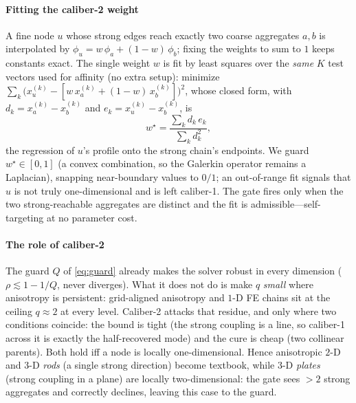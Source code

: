 \documentclass[review]{siamart220329}
\begin{document}
\paragraph{Fitting the caliber-2 weight} A fine node $u$ whose strong edges reach exactly two
coarse aggregates $a,b$ is interpolated by $\phi_u=w\,\phi_a+(1-w)\,\phi_b$; fixing the weights
to sum to $1$ keeps constants exact. The single weight $w$ is fit by least squares over the
\emph{same} $K$ test vectors used for affinity (no extra setup): minimize
$\sum_k \big(x^{(k)}_u-[w\,x^{(k)}_a+(1-w)\,x^{(k)}_b]\big)^2$, whose closed form, with
$d_k=x^{(k)}_a-x^{(k)}_b$ and $e_k=x^{(k)}_u-x^{(k)}_b$, is
\begin{equation}\label{eq:wfit}
w^\star=\frac{\sum_k d_k\,e_k}{\sum_k d_k^2},
\end{equation}
the regression of $u$'s profile onto the strong chain's endpoints. We guard $w^\star\in[0,1]$
(a convex combination, so the Galerkin operator remains a Laplacian), snapping
near-boundary values to $0/1$; an out-of-range fit signals that $u$ is not truly one-dimensional
and is left caliber-1. The gate fires only when the two strong-reachable aggregates are distinct
and the fit is admissible---self-targeting at no parameter cost.

\paragraph{The role of caliber-2} The guard $Q$ of \eqref{eq:guard} already makes the solver robust in every
dimension ($\rho\lesssim1-1/Q$, never diverges). What it does not do is make $q$ \emph{small}
where anisotropy is persistent: grid-aligned anisotropy and $1$-D FE chains sit at the ceiling
$q\approx2$ at every level. Caliber-2 attacks that residue, and only where two conditions
coincide: the bound is tight (the strong coupling is a line, so caliber-1 across it is exactly
the half-recovered mode) and the cure is cheap (two collinear parents). Both hold iff a node is
locally one-dimensional. Hence anisotropic $2$-D and $3$-D \emph{rods} (a single strong
direction) become textbook, while $3$-D \emph{plates} (strong coupling in a plane) are locally
two-dimensional: the gate sees $>2$ strong aggregates and correctly declines, leaving this case to the guard.
\end{document}
